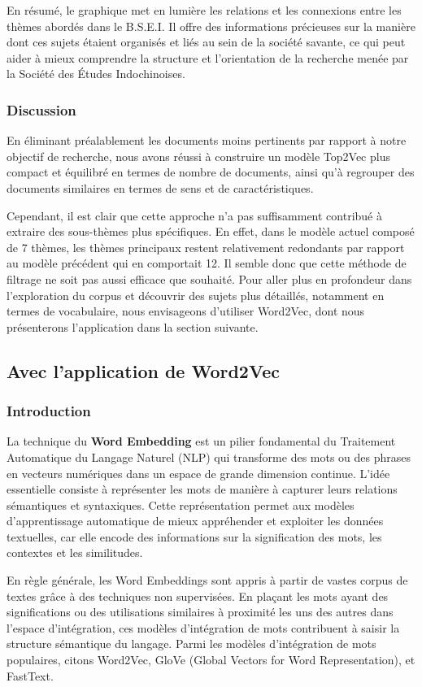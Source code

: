 En résumé, le graphique met en lumière les relations et les connexions entre les thèmes abordés dans le B.S.E.I. Il offre des informations précieuses sur la manière dont ces sujets étaient organisés et liés au sein de la société savante, ce qui peut aider à mieux comprendre la structure et l'orientation de la recherche menée par la Société des Études Indochinoises.

\subsubsection{Discussion}
En éliminant préalablement les documents moins pertinents par rapport à notre objectif de recherche, nous avons réussi à construire un modèle Top2Vec plus compact et équilibré en termes de nombre de documents, ainsi qu'à regrouper des documents similaires en termes de sens et de caractéristiques. 

Cependant, il est clair que cette approche n'a pas suffisamment contribué à extraire des sous-thèmes plus spécifiques. En effet, dans le modèle actuel composé de 7 thèmes, les thèmes principaux restent relativement redondants par rapport au modèle précédent qui en comportait 12. Il semble donc que cette méthode de filtrage ne soit pas aussi efficace que souhaité. Pour aller plus en profondeur dans l'exploration du corpus et découvrir des sujets plus détaillés, notamment en termes de vocabulaire, nous envisageons d'utiliser Word2Vec, dont nous présenterons l'application dans la section suivante.
\newpage 
\subsection{Avec l'application de Word2Vec}
\subsubsection{Introduction}
La technique du \textbf{Word Embedding} est un pilier fondamental du Traitement Automatique du Langage Naturel (NLP) qui transforme des mots ou des phrases en vecteurs numériques dans un espace de grande dimension continue. L'idée essentielle consiste à représenter les mots de manière à capturer leurs relations sémantiques et syntaxiques. Cette représentation permet aux modèles d'apprentissage automatique de mieux appréhender et exploiter les données textuelles, car elle encode des informations sur la signification des mots, les contextes et les similitudes.

En règle générale, les Word Embeddings sont appris à partir de vastes corpus de textes grâce à des techniques non supervisées. En plaçant les mots ayant des significations ou des utilisations similaires à proximité les uns des autres dans l'espace d'intégration, ces modèles d'intégration de mots contribuent à saisir la structure sémantique du langage. Parmi les modèles d'intégration de mots populaires, citons Word2Vec, GloVe (Global Vectors for Word Representation), et FastText.

